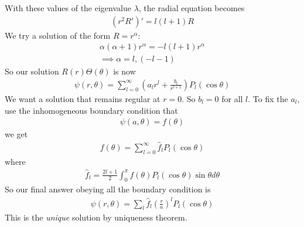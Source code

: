 \documentclass[a4paper]{article}
\begin{document}
With these values of the eigenvalue $\lambda$, the radial equation becomes
\begin{equation*}
\begin{aligned}
\left(r^2 R'\right)' = l\left(l+1\right)R
\end{aligned}
\end{equation*}
We try a solution of the form $R=r^\alpha$:
\begin{equation*}
\begin{aligned}
\alpha\left(\alpha+1\right)r^\alpha = -l\left(l+1\right) r^\alpha\\
\implies \alpha = l,\left(-l-1\right)
\end{aligned}
\end{equation*}
So our solution $R\left(r\right) \Theta\left(\theta\right)$ is now
\begin{equation*}
\begin{aligned}
\psi\left(r,\theta\right) = \sum_{l=0}^\infty \left(a_l r^l + \frac{b_l}{r^{l+1}}\right) P_l \left(\cos\theta\right)
\end{aligned}
\end{equation*}
We want a solution that remains regular at $r=0$. So $b_l=0$ for all $l$. To fix the $a_l$, use the inhomogeneous boundary condition that
\begin{equation*}
\begin{aligned}
\psi\left(a,\theta\right) = f\left(\theta\right)
\end{aligned}
\end{equation*}
we get
\begin{equation*}
\begin{aligned}
f\left(\theta\right) = \sum_{l=0}^\infty \hat{f}_l P_l\left(\cos\theta\right)
\end{aligned}
\end{equation*}
where
\begin{equation*}
\begin{aligned}
\hat{f}_l  = \frac{2l+1}{2}\int_0^\pi f\left(\theta\right) P_l\left(\cos\theta\right) \sin\theta d\theta
\end{aligned}
\end{equation*}
So our final answer obeying all the boundary condition is
\begin{equation*}
\begin{aligned}
\psi\left(r,\theta\right) = \sum_l \hat{f}_l \left(\frac{r}{a}\right)^l P_l\left(\cos\theta\right)
\end{aligned}
\end{equation*}
This is the \emph{unique} solution by uniqueness theorem.
\end{document}
